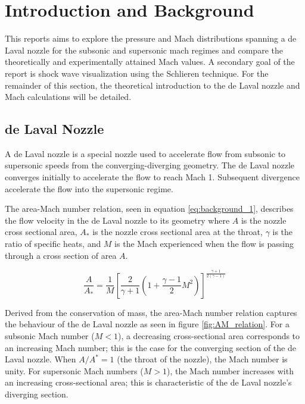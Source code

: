 \documentclass[runningheads]{llncs}
\begin{document}


\newpage
\section{Introduction and Background}\label{sec:introduction_and_background}

This reports aims to explore the pressure and Mach distributions spanning a de Laval nozzle for the subsonic and supersonic mach regimes and compare the theoretically and experimentally attained Mach values. A secondary goal of the report is shock wave visualization using the Schlieren technique. For the remainder of this section, the theoretical introduction to the de Laval nozzle and Mach calculations will be detailed.

\subsection{de Laval Nozzle}

A de Laval nozzle is a special nozzle used to accelerate flow from subsonic to supersonic speeds from the converging-diverging geometry. The de Laval nozzle converges initially to accelerate the flow to reach Mach 1. Subsequent divergence accelerate the flow into the supersonic regime.\newline

\noindent
The area-Mach number relation, seen in equation \ref{eq:background_1}, describes the flow velocity in the de Laval nozzle to its geometry where $A$ is the nozzle cross sectional area, $A_*$ is the nozzle cross sectional area at the throat, $\gamma$ is the ratio of specific heats, and $M$ is the Mach experienced when the flow is passing through a cross section of area $A$.

\begin{equation}
    \frac{A}{A_*}=\frac{1}{M}\left[\frac{2}{\gamma + 1}\left(1 + \frac{\gamma - 1}{2}M^2\right)\right]^{\frac{\gamma + 1}{2(\gamma - 1)}}
    \label{eq:background_1}
\end{equation}

\noindent
Derived from the conservation of mass, the area-Mach number relation captures the behaviour of the de Laval nozzle as seen in figure \ref{fig:AM_relation}. For a subsonic Mach number ($M<1$), a decreasing cross-sectional area corresponds to an increasing Mach number; this is the case for the converging section of the de Laval nozzle. When $A/A^*=1$ (the throat of the nozzle), the Mach number is unity. For supersonic Mach numbers ($M>1$), the Mach number increases with an increasing cross-sectional area; this is characteristic of the de Laval nozzle's diverging section.
\end{document}
